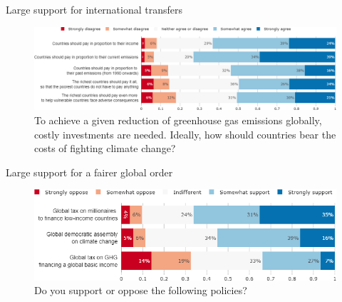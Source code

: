 \begin{framefont}{\small}
\begin{frame}{Large support for international transfers}%
\begin{figure}[h!]
\centering
\caption{To achieve a given reduction of greenhouse gas emissions globally, costly investments are needed.
Ideally, how should countries bear the costs of fighting climate change?}
\vspace{2mm}
\includegraphics[width=\paperwidth]{../figures/FR/burden_sharing_FR.png}
\end{figure}
\end{frame}

\begin{frame}{Large support for a fairer global order}%
\begin{figure}[h!]
\centering
\caption{Do you support or oppose the following policies?}
\vspace{2mm}
\includegraphics[width=.87\paperwidth]{../figures/FR/global_policies_FR.png}
\end{figure}
\end{frame}


\end{framefont}
